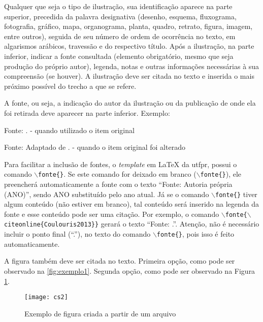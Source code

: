 Qualquer que seja o tipo de ilustração, sua identificação aparece na parte superior, precedida da palavra designativa (desenho, esquema, fluxograma, fotografia, gráfico, mapa, organograma, planta, quadro, retrato, figura, imagem, entre outros), seguida de seu número de ordem de ocorrência no texto, em algarismos arábicos, travessão e do respectivo título. Após a ilustração, na parte inferior, indicar a fonte consultada (elemento obrigatório, mesmo que seja produção do próprio autor), legenda, notas e outras informações necessárias à sua compreensão (se houver). A ilustração deve ser citada no texto e inserida o mais próximo possível do trecho a que se refere.

A fonte, ou seja, a indicação do autor da ilustração ou da publicação de onde ela foi retirada deve aparecer na parte inferior. Exemplo:

Fonte: . 			- quando utilizado o item original

Fonte: Adaptado de .	- quando o item original foi alterado

Para facilitar a inclusão de fontes, o \textit{template} em LaTeX da \gls{utfpr}, possui o comando \texttt{$\backslash$fonte\{\}}. Se este comando for deixado em branco (\texttt{$\backslash$fonte\{\}}),  ele preencherá automaticamente a fonte com o texto  ``Fonte: Autoria própria (ANO)'', sendo ANO substituído pelo ano atual. Já se o comando \texttt{$\backslash$fonte\{\}} tiver algum conteúdo (não estiver em branco), tal conteúdo será inserido na legenda da fonte e esse conteúdo pode ser uma citação. Por exemplo, o comando \texttt{$\backslash$fonte\{$\backslash$citeonline\{Coulouris2013\}\}} gerará o texto ``Fonte: .''. Atenção, não é necessário incluir o ponto final (``.''), no texto do comando \texttt{$\backslash$fonte\{\}}, pois isso é feito automaticamente.

A figura também deve ser citada no texto. Primeira opção, como pode ser observado na \autoref{fig:exemplo1}. Segunda opção, como pode ser observado na Figura \ref{fig:exemplo1}.

\begin{figure}[htb]%
  \caption{Exemplo de figura criada a partir de um arquivo}%
  \label{fig:exemplo1}%
  \texttt{[image: cs2]}%
\end{figure}

